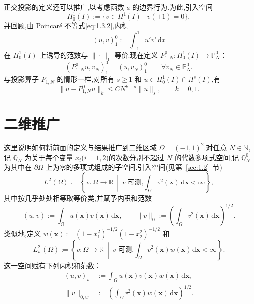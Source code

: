 正交投影的定义还可以推广,以考虑函数 \(u\) 的边界行为.为此,引入空间
\begin{equation}\label{eq:4.4.34}
  H^1_0(I):=\{v\in H^1(I)\mid v(\pm1)=0\},
\end{equation}
并回顾,由 Poincaré 不等式\eqref{eq:1.3.2},内积
\begin{equation}\label{eq:4.4.35}
  (u,v)^0_1:=\int_{-1}^1 u'v'\,\mathrm dx
\end{equation}
在 \(H^1_0(I)\) 上诱导的范数与 \(\|\cdot\|_1\) 等价.现在定义 \(P_{1,N}^0\colon H^1_0(I)\to\mathbb P_N^0\)：
\begin{equation}\label{eq:4.4.36}
  (P_{1,N}^0u,v_N)^0_1=(u,v_N)^0_1\qquad\forall v_N\in\mathbb P_N^0.
\end{equation}
与投影算子 \(P_{1,N}\) 的情形一样,对所有 \(s\ge1\) 和 \(u\in H_0^1(I)\cap H^s(I)\),有
\begin{equation}\label{eq:4.4.37}
  \|u-P_{1,N}^0u\|_k\le CN^{k-s}\|u\|_s,\qquad k=0,1.
\end{equation}

\section{二维推广}\label{sec:4.5}

这里说明如何将前面的定义与结果推广到二维区域 \(\Omega=(-1,1)^2\).对任意 \(N\in\mathbb N\),记 \(\mathbb Q_N\) 为关于每个变量 \(x_i\)(\(i=1,2\))的次数分别不超过 \(N\) 的代数多项式空间,记 \(\mathbb Q_N^0\) 为其中在 \(\partial\Omega\) 上为零的多项式组成的子空间.引入空间(见第~\ref{sec:1.2}~节)
\begin{equation}\label{eq:4.5.1}
  L^2(\Omega):=\left\{v\colon\Omega\to\mathbb R\ \middle|\
    v\text{ 可测,}\int_\Omega v^2(\boldsymbol{x})\,\mathrm d\boldsymbol{x}<\infty\right\},
\end{equation}
其中按几乎处处相等取等价类,并赋予内积和范数
\begin{equation}\label{eq:4.5.2}
  (u,v):=\int_\Omega u(\boldsymbol{x})v(\boldsymbol{x})\,\mathrm d\boldsymbol{x},
  \qquad
  \|v\|_0:=\left(\int_\Omega v^2(\boldsymbol{x})\,\mathrm d\boldsymbol{x}\right)^{1/2}.
\end{equation}
类似地,定义 \(w(\boldsymbol{x}):=(1-x_1^2)^{-1/2}(1-x_2^2)^{-1/2}\) 和
\begin{equation}\label{eq:4.5.3}
  L_w^2(\Omega):=\left\{v\colon\Omega\to\mathbb R\ \middle|\
  v\text{ 可测,}\int_\Omega v^2(\boldsymbol{x})w(\boldsymbol{x})\,\mathrm d\boldsymbol{x}<\infty\right\}.
\end{equation}
这一空间赋有下列内积和范数：
\begin{equation}\label{eq:4.5.4}
  \begin{aligned}
    (u,v)_w&:=\int_\Omega u(\boldsymbol{x})v(\boldsymbol{x})w(\boldsymbol{x})\,\mathrm d\boldsymbol{x},\\
    \|v\|_{0,w}&:=\left(\int_\Omega v^2(\boldsymbol{x})w(\boldsymbol{x})\,\mathrm d\boldsymbol{x}\right)^{1/2}.
  \end{aligned}
\end{equation}

